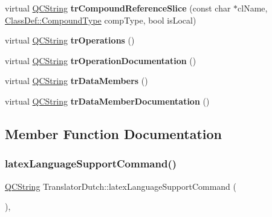 \begin{DoxyCompactItemize}
\item 
\mbox{\label{class_translator_dutch_a183291917535482b3ac05a3eb67f3217}} 
virtual \mbox{\hyperlink{class_q_c_string}{Q\+C\+String}} {\bfseries tr\+Compound\+Reference\+Slice} (const char $\ast$cl\+Name, \mbox{\hyperlink{class_class_def_ae70cf86d35fe954a94c566fbcfc87939}{Class\+Def\+::\+Compound\+Type}} comp\+Type, bool is\+Local)
\item 
\mbox{\label{class_translator_dutch_a9536b9b813856d86dd32abf2d69ab0ee}} 
virtual \mbox{\hyperlink{class_q_c_string}{Q\+C\+String}} {\bfseries tr\+Operations} ()
\item 
\mbox{\label{class_translator_dutch_a3ad4029621691a0384b9455d32d25153}} 
virtual \mbox{\hyperlink{class_q_c_string}{Q\+C\+String}} {\bfseries tr\+Operation\+Documentation} ()
\item 
\mbox{\label{class_translator_dutch_a142506c9aba5c9e8c2ac96c2223c2136}} 
virtual \mbox{\hyperlink{class_q_c_string}{Q\+C\+String}} {\bfseries tr\+Data\+Members} ()
\item 
\mbox{\label{class_translator_dutch_af1e16c328282267056b358d1f5ed5c06}} 
virtual \mbox{\hyperlink{class_q_c_string}{Q\+C\+String}} {\bfseries tr\+Data\+Member\+Documentation} ()
\end{DoxyCompactItemize}


\subsection{Member Function Documentation}
\mbox{\label{class_translator_dutch_a325c81f044aba5c86da2e2741a092119}} 
\subsubsection{\texorpdfstring{latexLanguageSupportCommand()}{latexLanguageSupportCommand()}}
{\footnotesize\ttfamily \mbox{\hyperlink{class_q_c_string}{Q\+C\+String}} Translator\+Dutch\+::latex\+Language\+Support\+Command (\begin{DoxyParamCaption}{ }\end{DoxyParamCaption})\hspace{0.3cm}{\ttfamily [inline]}, {\ttfamily [virtual]}}


